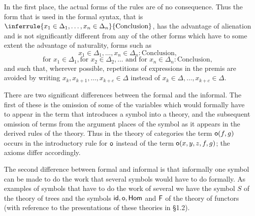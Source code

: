 In the first place, the actual forms of the rules are of no consequence.
%
Thus the form that is used in the formal syntax, that is $\inferrule{x_1\in\Delta_1,\ldots,x_n\in\Delta_n}{\text{Conclusion}}$, has the advantage of alienation and is not significantly different from any of the other forms which have to some extent the advantage of naturality, forms such as
\[x_1\in\Delta_1,\ldots,x_n\in\Delta_n: \text{Conclusion},\]
\[\text{for }x_1\in\Delta_1,\text{for }x_2\in\Delta_2,\ldots \text{ and for }x_n\in\Delta_n: \text{Conclusion},\]
and such that, wherever possible, repetitions of expressions in the premis are avoided by writing $x_k,x_{k+1},\ldots,x_{k+c}\in\Delta$ instead of $x_k\in\Delta,\ldots, x_{k+c}\in\Delta$.

There are two significant differences between the formal and the informal.
%
The first of these is the omission of some of the variables which would formally have to appear in the term that introduces a symbol into a theory, and the subsequent omission of terms from the argument places of the symbol as it appears in the derived rules of the theory.
%
Thus in the theory of categories the term $\mathsf{o}(f,g)$ occurs in the introductory rule for $\mathsf{o}$ instead of the term $\mathsf{o}(x,y,z,f,g)$; the axioms differ accordingly.

The second difference between formal and informal is that informally one symbol can be made to do the work that several symbols would have to do formally.
%
As examples of symbols that have to do the work of several we have the symbol $S$ of the theory of trees and the symbols $\mathsf{id},\mathsf{o},\mathsf{Hom}$ and $\mathsf{F}$ of the theory of functors (with reference to the presentations of these theories in \S 1.2).

